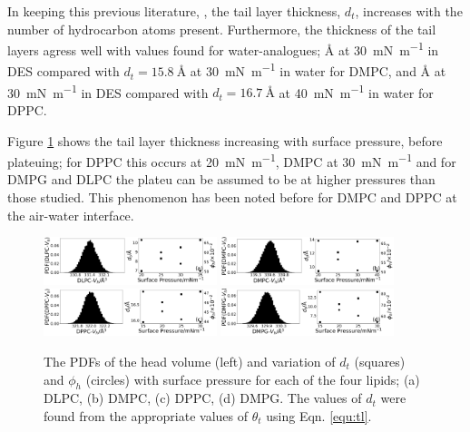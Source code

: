 \documentclass[twocolumn,a4paper]{paper}
\begin{document}
In keeping this previous literature, \cite{Mohwald1990,Vaknin1991}, the tail layer thickness, $d_t$, increases with the number of hydrocarbon atoms present.
Furthermore, the thickness of the tail layers agress well with values found for water-analogues; \si{\angstrom} at \SI{30}{\milli\newton\per\meter} in DES compared with $d_t=\SI{15.8}{\angstrom}$ at \SI{30}{\milli\newton\per\meter}\cite{Johnson1991} in water for DMPC, and \si{\angstrom} at \SI{30}{\milli\newton\per\meter} in DES compared with $d_t=\SI{16.7}{\angstrom}$ at \SI{40}{\milli\newton\per\meter}\cite{Helm1987} in water for DPPC.

Figure \ref{fig:lipresults} shows the tail layer thickness increasing with surface pressure, before plateuing; for DPPC this occurs at \SI{20}{\milli\newton\per\meter}, DMPC at \SI{30}{\milli\newton\per\meter} and for DMPG and DLPC the plateu can be assumed to be at higher pressures than those studied.
This phenomenon has been noted before for DMPC\cite{Bayerl1990} and DPPC\cite{Campbell2018} at the air-water interface.
%
\begin{figure}
	\centering
	\includegraphics[width=0.45\textwidth]{figures/dlpc_vh_dt_phi}
	\includegraphics[width=0.45\textwidth]{figures/dmpc_vh_dt_phi}
	\includegraphics[width=0.45\textwidth]{figures/dppc_vh_dt_phi}
	\includegraphics[width=0.45\textwidth]{figures/dmpg_vh_dt_phi}
	\caption{\small The PDFs of the head volume (left) and variation of $d_t$ (squares) and $\phi_h$ (circles) with surface pressure for each of the four lipids; (a) DLPC, (b) DMPC, (c) DPPC, (d) DMPG. The values of $d_t$ were found from the appropriate values of $\theta_t$ using Eqn. \ref{equ:tl}.}
	\label{fig:lipresults}
\end{figure}
%
\end{document}
